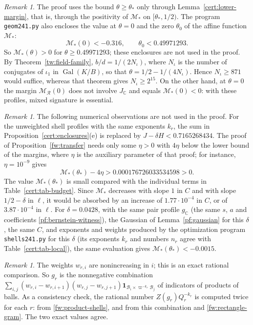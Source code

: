 \documentclass[11pt]{amsart}
\numberwithin{equation}{section}
\theoremstyle{definition}
\theoremstyle{remark}
\newtheorem{remark}[equation]{Remark}
\DeclareMathOperator{\Gal}{Gal}
\newcommand{\C}{\mathbb C}
\begin{document}
\begin{remark}\label{cert:signature-remark}
The proof uses the bound $\theta\ge\theta_*$ only through
Lemma~\ref{cert:lower-margin}, that is, through the positivity of
$\mathcal M_*$ on $[\theta_*,1/2)$. The program \texttt{geom241.py} also
encloses the value at $\theta=0$ and the zero $\theta_0$ of the affine
function $\mathcal M_*$:
\[
 \mathcal M_*(0)<-0.316,\qquad \theta_0<0.49971293 .
\]
So $\mathcal M_*(\theta)>0$ for $\theta\ge0.49971293$; these enclosures
are not used in the proof. By Theorem~\ref{tw:field-family},
$b/d=1/(2N_\iota)$, where $N_\iota$ is the number of conjugates of
$\iota_1$ in $\Gal(K/B)$, so that $\theta=1/2-1/(4N_\iota)$. Hence
$N_\iota\ge871$ would suffice, whereas that theorem gives
$N_\iota\ge2^{15}$. On the other hand, at $\theta=0$ the margin
$\mathcal M_{\mathcal R}(0)$ does not involve $J_\C$ and equals
$\mathcal M_*(0)<0$: with these profiles, mixed signature is essential.
\end{remark}

\begin{remark}\label{cert:observations}
The following numerical observations are not used in the proof. For the
unweighted shell profiles with the same exponents $k_r$, the sum in
Proposition~\ref{cert:enclosures}(e) is replaced by
$J-\delta H<0.7165268434$. The proof of Proposition~\ref{fw:transfer}
needs only some $\eta>0$ with $4\eta$ below the lower bound of the
margins, where $\eta$ is the auxiliary parameter of that proof; for
instance, $\eta=10^{-9}$ gives
\begin{equation}\label{cert:final-margin}
 \mathcal M_*(\theta_*)-4\eta>0.000176726033534598>0 .
\end{equation}
The value $\mathcal M_*(\theta_*)$ is small compared with the individual
terms in Table~\ref{cert:tab-budget}. Since $\mathcal M_*$ decreases with
slope $1$ in $C$ and with slope $1/2-\delta$ in $\ell$, it would be
absorbed by an increase of $1.77\cdot10^{-4}$ in $C$, or of
$3.87\cdot10^{-4}$ in $\ell$. For $\delta=0.0428$, with the same pair
profile $g_\C$ (the same $s$, $a$ and coefficients
\eqref{pf:bernstein-witness}), the Gaussian of Lemma~\ref{pf:gaussian}
for this $\delta$, the same $C$, and exponents and weights produced by
the optimization program \texttt{shells241.py} for this $\delta$ (its
exponents $k_r$ and numbers $n_r$ agree with
Table~\ref{cert:tab-local}), the same evaluation gives
$\mathcal M_*(\theta_*)<-0.0015$.
\end{remark}

\begin{remark}\label{cert:consistency}
The weights $w_{r,i}$ are nonincreasing in $i$; this is an exact
rational comparison. So $g_r$ is the nonnegative combination
$\sum_{i,j}(w_{r,i}-w_{r,i+1})(w_{r,j}-w_{r,j+1})\mathbf 1_{\mathcal
B_i\times\varpi^{-k_r}\mathcal B_j}$ of indicators of products of balls.
As a consistency check, the rational number $Z(g_r)Q_r^{-k_r}$ is
computed twice for each $r$: from \eqref{fw:product-shells}, and from
this combination and \eqref{fw:rectangle-gram}. The two exact values
agree.
\end{remark}
\end{document}
